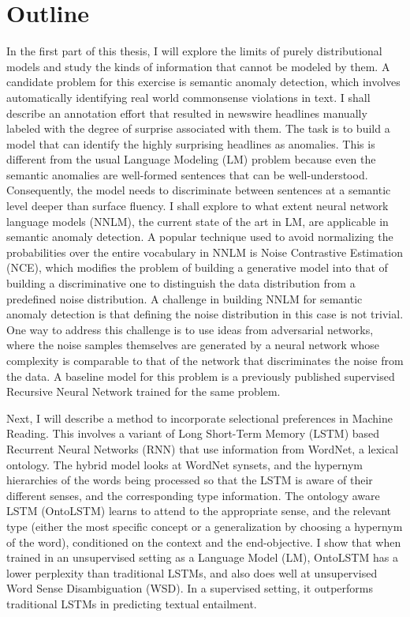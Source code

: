 
\section{Outline}
In the first part of this thesis, I will explore the limits of purely distributional models
and study the kinds of information that cannot be modeled by them. A candidate problem for this
exercise is semantic anomaly detection, which involves automatically 
identifying real world commonsense violations in text. I shall describe an annotation
effort that resulted in newswire headlines manually labeled with the degree
of surprise associated with them. The task is to build a model that can identify the highly
surprising headlines as anomalies. This is different from the usual Language Modeling (LM) problem
because even the semantic anomalies are well-formed sentences that can be well-understood. Consequently,
the model needs to discriminate between sentences at a semantic level deeper than surface fluency.
I shall explore to what extent neural network language models (NNLM), the current state of the art in LM,
are applicable in semantic anomaly detection. A popular technique used to avoid normalizing the probabilities
over the entire vocabulary in NNLM is Noise Contrastive Estimation (NCE), which modifies the problem of 
building a generative model into that of building a discriminative one to distinguish the data distribution
from a predefined noise distribution. A challenge in building NNLM for semantic anomaly detection is that defining 
the noise distribution in this case is not trivial. One way to address this challenge is to use ideas from 
adversarial networks, where the noise samples themselves are generated by a neural network whose complexity
is comparable to that of the network that discriminates the noise from the data. A baseline model for this 
problem is a previously published supervised Recursive Neural Network trained for the same problem.


Next, I will describe a method to incorporate selectional 
preferences in Machine Reading. This involves a variant of Long Short-Term
Memory (LSTM) based Recurrent Neural Networks (RNN) that use information
from WordNet, a lexical 
ontology. The hybrid model looks at WordNet synsets, and the hypernym hierarchies of the
words being processed so that the 
LSTM is aware of their different senses, and the corresponding type information.
The ontology aware LSTM (OntoLSTM) learns to attend to the appropriate sense,
and the relevant type 
(either the most specific concept or a generalization by choosing a hypernym of
the word), conditioned on the context and the end-objective. I show that when
trained in an 
unsupervised setting as a Language Model (LM), OntoLSTM has a lower perplexity
than traditional LSTMs, and also does well at unsupervised Word Sense
Disambiguation (WSD). In a supervised setting, 
it outperforms traditional LSTMs in predicting textual entailment.

